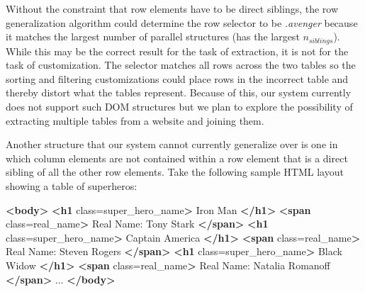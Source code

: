 \documentclass[sigconf,10pt]{acmart}
\newenvironment{Shaded}{}{}
\newcommand{\KeywordTok}[1]{\textcolor[rgb]{0.00,0.44,0.13}{\textbf{#1}}}
\newcommand{\NormalTok}[1]{#1}
\newcommand{\OtherTok}[1]{\textcolor[rgb]{0.00,0.44,0.13}{#1}}
\newcommand{\StringTok}[1]{\textcolor[rgb]{0.25,0.44,0.63}{#1}}
\begin{document}
Without the constraint that row elements have to be direct siblings, the
row generalization algorithm could determine the row selector to be
\emph{.avenger} because it matches the largest number of parallel
structures (has the largest \(n_{siblings}\)). While this may be the
correct result for the task of extraction, it is not for the task of
customization. The selector matches all rows across the two tables so
the sorting and filtering customizations could place rows in the
incorrect table and thereby distort what the tables represent. Because
of this, our system currently does not support such DOM structures but
we plan to explore the possibility of extracting multiple tables from a
website and joining them.

Another structure that our system cannot currently generalize over is
one in which column elements are not contained within a row element that
is a direct sibling of all the other row elements. Take the following
sample HTML layout showing a table of superheros:

\begin{Shaded}
\begin{Highlighting}[]
\KeywordTok{\textless{}body\textgreater{}}
  \KeywordTok{\textless{}h1}\OtherTok{ class=}\StringTok{\textquotesingle{}super\_hero\_name\textquotesingle{}}\KeywordTok{\textgreater{}}\NormalTok{ Iron Man }\KeywordTok{\textless{}/h1\textgreater{}}
  \KeywordTok{\textless{}span}\OtherTok{ class=}\StringTok{\textquotesingle{}real\_name\textquotesingle{}}\KeywordTok{\textgreater{}}\NormalTok{ Real Name: Tony Stark }\KeywordTok{\textless{}/span\textgreater{}}
  \KeywordTok{\textless{}h1}\OtherTok{ class=}\StringTok{\textquotesingle{}super\_hero\_name\textquotesingle{}}\KeywordTok{\textgreater{}}\NormalTok{ Captain America }\KeywordTok{\textless{}/h1\textgreater{}}
  \KeywordTok{\textless{}span}\OtherTok{ class=}\StringTok{\textquotesingle{}real\_name\textquotesingle{}}\KeywordTok{\textgreater{}}\NormalTok{ Real Name: Steven Rogers }\KeywordTok{\textless{}/span\textgreater{}}
  \KeywordTok{\textless{}h1}\OtherTok{ class=}\StringTok{\textquotesingle{}super\_hero\_name\textquotesingle{}}\KeywordTok{\textgreater{}}\NormalTok{ Black Widow }\KeywordTok{\textless{}/h1\textgreater{}}
  \KeywordTok{\textless{}span}\OtherTok{ class=}\StringTok{\textquotesingle{}real\_name\textquotesingle{}}\KeywordTok{\textgreater{}}\NormalTok{ Real Name: Natalia Romanoff }\KeywordTok{\textless{}/span\textgreater{}}
\NormalTok{  ...}
\KeywordTok{\textless{}/body\textgreater{}}
\end{Highlighting}
\end{Shaded}
\end{document}
